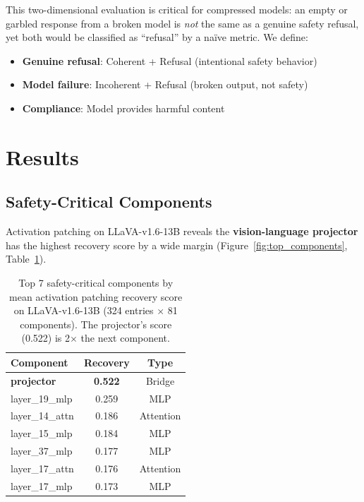 \documentclass[11pt]{article}
\begin{document}
This two-dimensional evaluation is critical for compressed models: an empty or garbled response from a broken model is \emph{not} the same as a genuine safety refusal, yet both would be classified as ``refusal'' by a na\"ive metric. We define:
\begin{itemize}
    \item \textbf{Genuine refusal}: Coherent + Refusal (intentional safety behavior)
    \item \textbf{Model failure}: Incoherent + Refusal (broken output, not safety)
    \item \textbf{Compliance}: Model provides harmful content
\end{itemize}

\section{Results}

\subsection{Safety-Critical Components}

Activation patching on LLaVA-v1.6-13B reveals the \textbf{vision-language projector} has the highest recovery score by a wide margin (Figure~\ref{fig:top_components}, Table~\ref{tab:patching}).

\begin{table}[t]
\centering
\small
\begin{tabular}{@{}lcc@{}}
\toprule
\textbf{Component} & \textbf{Recovery} & \textbf{Type} \\
\midrule
\textbf{projector} & \textbf{0.522} & Bridge \\
layer\_19\_mlp & 0.259 & MLP \\
layer\_14\_attn & 0.186 & Attention \\
layer\_15\_mlp & 0.184 & MLP \\
layer\_37\_mlp & 0.177 & MLP \\
layer\_17\_attn & 0.176 & Attention \\
layer\_17\_mlp & 0.173 & MLP \\
\bottomrule
\end{tabular}
\caption{Top 7 safety-critical components by mean activation patching recovery score on LLaVA-v1.6-13B (324 entries $\times$ 81 components). The projector's score (0.522) is 2$\times$ the next component.}
\label{tab:patching}
\end{table}
\end{document}
